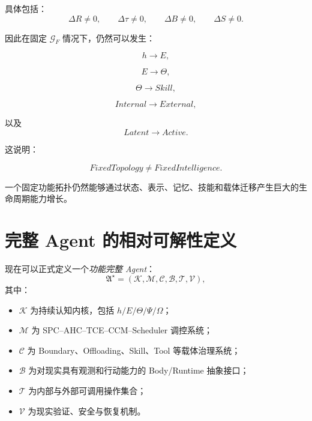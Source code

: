 具体包括：
\begin{equation}
\Delta R\neq0,
\qquad
\Delta \tau\neq0,
\qquad
\Delta B\neq0,
\qquad
\Delta S\neq0.
\end{equation}

因此在固定 $\mathcal G_F$ 情况下，仍然可以发生：

\begin{equation}
h
\rightarrow
E,
\end{equation}

\begin{equation}
E
\rightarrow
\Theta,
\end{equation}

\begin{equation}
\Theta
\rightarrow
Skill,
\end{equation}

\begin{equation}
Internal
\rightarrow
External,
\end{equation}

以及
\begin{equation}
Latent
\rightarrow
Active.
\end{equation}

这说明：

\begin{equation}
\boxed{
FixedTopology
\neq
FixedIntelligence.
}
\end{equation}

一个固定功能拓扑仍然能够通过状态、表示、记忆、技能和载体迁移产生巨大的生命周期能力增长。

\section{完整 Agent 的相对可解性定义}

现在可以正式定义一个\emph{功能完整 Agent}：
\begin{equation}
\mathfrak A^\star
=
\left(
\mathcal K,
\mathcal M,
\mathcal C,
\mathcal B,
\mathcal T,
\mathcal V
\right),
\end{equation}
其中：

\begin{itemize}
    \item $\mathcal K$ 为持续认知内核，包括 $h/E/\Theta/\Psi/\Omega$；
    \item $\mathcal M$ 为 SPC--AHC--TCE--CCM--Scheduler 调控系统；
    \item $\mathcal C$ 为 Boundary、Offloading、Skill、Tool 等载体治理系统；
    \item $\mathcal B$ 为对现实具有观测和行动能力的 Body/Runtime 抽象接口；
    \item $\mathcal T$ 为内部与外部可调用操作集合；
    \item $\mathcal V$ 为现实验证、安全与恢复机制。
\end{itemize}


